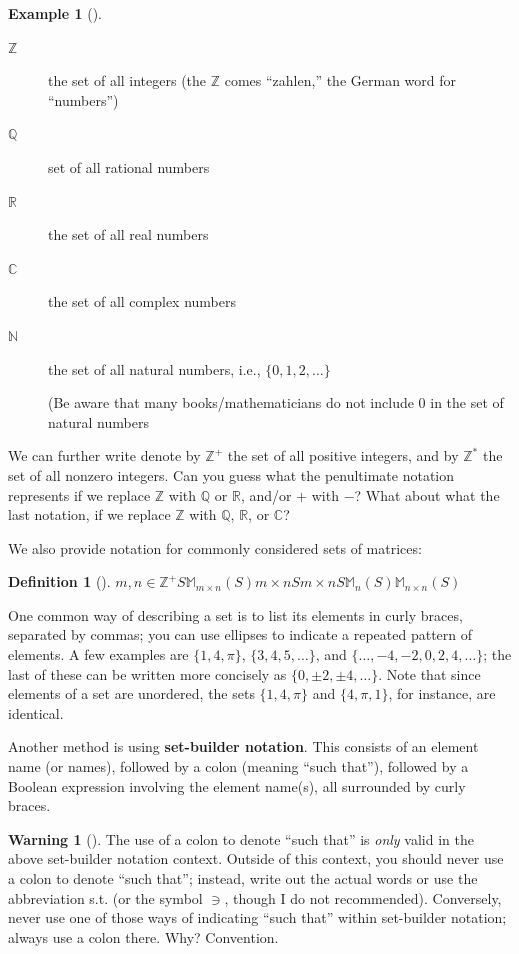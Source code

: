 \documentclass[10pt,]{book}
\newcommand{\terminology}[1]{\textbf{#1}}
\theoremstyle{plain}
\theoremstyle{definition}
\newtheorem{definition}[theorem]{Definition}
\theoremstyle{definition}
\newtheorem{warning}[theorem]{Warning}
\theoremstyle{definition}
\newtheorem{example}[theorem]{Example}
\theoremstyle{definition}
\numberwithin{equation}{section}
\def\Z{\mathbb{Z}}
\def\R{\mathbb{R}}
\def\Q{\mathbb{Q}}
\def\C{\mathbb{C}}
\def\N{\mathbb{N}}
\def\M{\mathbb{M}}
\begin{document}
\begin{example}[]\label{example-1}
\leavevmode%
\begin{description}
\item[{\(\Z\)}]\hypertarget{li-1}{}the set of all integers  (the \(\Z\) comes ``zahlen,'' the German word for ``numbers'')%
\item[{\(\Q\)}]\hypertarget{li-2}{}set of all rational numbers%
\item[{\(\R\)}]\hypertarget{li-3}{}the set of all real numbers%
\item[{\(\C\)}]\hypertarget{li-4}{}the set of all complex numbers%
\item[{\(\N\)}]\hypertarget{li-5}{}the set of all natural numbers, i.e., \(\{0, 1, 2, \ldots\}\)%
\par
(Be aware that many books/mathematicians do not include \(0\) in the set of natural numbers%
\end{description}
 We can further write denote by \(\Z^+\) the set of all positive integers, and by \(\Z^*\) the set of all nonzero integers. Can you guess what the penultimate notation represents if we replace \(\Z\) with \(\Q\) or \(\R\), and/or \(+\) with \(-\)? What about what the last notation, if we replace \(\Z\) with \(\Q\), \(\R\), or \(\C\)?%
\label{notation-4}
\label{notation-5}
\label{notation-6}
\label{notation-7}
\label{notation-8}
\label{notation-9}
\label{notation-10}
\label{notation-11}
\end{example}
We also provide notation for commonly considered sets of matrices:%
\begin{definition}[{}]\label{definition-3}
\(m,n\in \Z^+\)\(S\)\(\M_{m\times n}(S)\)\(m\times n\)\(S\)\(m\times n\)\(S\)\(\M_n(S)\)\(\M_{n\times n}(S)\)\label{notation-12}
\label{notation-13}
\end{definition}
One common way of describing a set is to list its elements in curly braces, separated by commas; you can use ellipses to indicate a repeated pattern of elements. A few examples are \(\{1,4,\pi\}\), \(\{3, 4, 5, \ldots\}\), and \(\{\ldots, -4, -2, 0,
2, 4, \ldots\}\); the last of these can be written more concisely as \(\{0,\pm 2, \pm 4,\ldots\}\). Note that since elements of a set are unordered, the sets \(\{1,4,\pi\}\) and \(\{4,\pi, 1\}\), for instance, are identical.%
\par
Another method is using \terminology{set-builder notation}. This consists of an element name (or names), followed by a colon (meaning ``such that''), followed by a Boolean expression involving the element name(s), all surrounded by curly braces. \begin{warning}[]\label{warning-1}
The use of a colon to denote ``such that'' is \emph{only} valid in the above set-builder notation context.  Outside of this context, you should never use a colon to denote ``such that''; instead, write out the actual words or use the abbreviation s.t. (or the symbol \(\ni\), though I do not recommended).  Conversely, never use one of those ways of indicating ``such that'' within set-builder notation; always use a colon there.  Why?  Convention.%
\end{warning}
\end{document}
